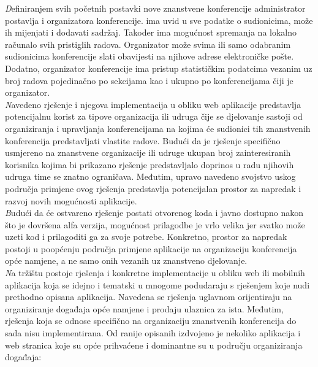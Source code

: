 		\textit Definiranjem svih početnih postavki nove znanstvene konferencije administrator postavlja i organizatora konferencije.  ima uvid u sve podatke o sudionicima, može ih mijenjati i dodavati sadržaj. Također ima mogućnost spremanja na lokalno računalo svih pristiglih radova. Organizator može svima ili samo odabranim sudionicima konferencije slati obavijesti na njihove adrese elektroničke pošte. Dodatno, organizator konferencije ima pristup statističkim podatcima vezanim uz broj radova pojedinačno po sekcijama kao i ukupno po konferencijama čiji je organizator.\\
		
		
		\textit Navedeno rješenje i njegova implementacija u obliku web aplikacije predstavlja potencijalnu korist za tipove organizacija ili udruga čije se djelovanje sastoji od organiziranja i upravljanja konferencijama na kojima će sudionici tih znanstvenih konferencija predstavljati vlastite radove. Budući da je rješenje specifično usmjereno na znanstvene organizacije ili udruge ukupan broj zainteresiranih korisnika kojima bi prikazano rješenje predstavljalo doprinos u radu njihovih udruga time se znatno ograničava. Međutim, upravo navedeno svojstvo uskog područja primjene ovog rješenja predstavlja potencijalan prostor za napredak i razvoj novih mogućnosti aplikacije.  \\
		
		\textit Budući da će ostvareno rješenje postati otvorenog koda i javno dostupno nakon što je dovršena alfa verzija, mogućnost prilagodbe je vrlo velika jer svatko može uzeti kod i prilagoditi ga za svoje potrebe. Konkretno, prostor za napredak postoji u poopćenju područja primjene aplikacije na organizaciju konferencija opće namjene, a ne samo onih vezanih uz znanstveno djelovanje.  \\
		
		\textit Na tržištu postoje rješenja i konkretne implementacije u obliku web ili mobilnih aplikacija koja se idejno i tematski u mnogome podudaraju s rješenjem koje nudi prethodno opisana aplikacija. Navedena se rješenja uglavnom orijentiraju na organiziranje događaja opće namjene i prodaju ulaznica za ista. Međutim, rješenja koja se odnose specifično na organizaciju znanstvenih konferencija do sada nisu implementirana. Od ranije opisanih izdvojeno je nekoliko aplikacija i web stranica koje su opće prihvaćene i dominantne su u području organiziranja događaja:  \\ 
		
